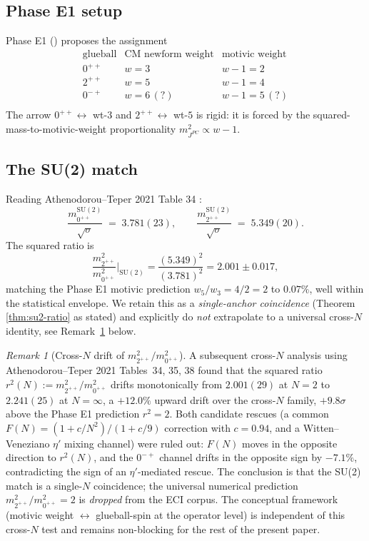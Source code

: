 \documentclass[11pt]{amsart}
\theoremstyle{definition}
\theoremstyle{remark}
\newtheorem{remark}[theorem]{Remark}
\begin{document}
\subsection{Phase E1 setup}\label{ss:phase-e1}

Phase E1 (\cite{PhaseE1}) proposes the assignment
\begin{equation}\label{eq:phase-e1-table}
\begin{array}{l|l|l}
\text{glueball} & \text{CM newform weight} & \text{motivic weight} \\ \hline
0^{++} & w = 3 & w - 1 = 2 \\
2^{++} & w = 5 & w - 1 = 4 \\
0^{-+} & w = 6\, (?) & w - 1 = 5\, (?) \\
\end{array}
\end{equation}
The arrow $0^{++} \leftrightarrow $ wt-$3$ and $2^{++} \leftrightarrow $ wt-$5$
is rigid: it is forced by the squared-mass-to-motivic-weight
proportionality $m_{J^{PC}}^2 \propto w - 1$.

\subsection{The SU(2) match}\label{ss:su2-match}

Reading Athenodorou--Teper 2021 Table 34 \cite{Athenodorou2021}:
\[
\frac{m_{0^{++}}^{\mathrm{SU(2)}}}{\sqrt{\sigma}} \;=\; 3.781(23),
\qquad
\frac{m_{2^{++}}^{\mathrm{SU(2)}}}{\sqrt{\sigma}} \;=\; 5.349(20).
\]
The squared ratio is
\[
\frac{m_{2^{++}}^2}{m_{0^{++}}^2}\bigg|_{\mathrm{SU(2)}}
= \frac{(5.349)^2}{(3.781)^2} = 2.001 \pm 0.017,
\]
matching the Phase E1 motivic prediction $w_{5}/w_{3} = 4/2 = 2$
to $0.07\%$, well within the statistical envelope. We retain this as
a \emph{single-anchor coincidence} (Theorem
\ref{thm:su2-ratio} as stated) and explicitly do \emph{not} extrapolate
to a universal cross-$N$ identity, see Remark~\ref{rk:phase-e1-cross-N-drift}
below.

\begin{remark}[Cross-$N$ drift of $m_{2^{++}}^2/m_{0^{++}}^2$]
\label{rk:phase-e1-cross-N-drift}
A subsequent cross-$N$ analysis using Athenodorou--Teper 2021
Tables~34, 35, 38 found that the squared ratio
$r^2(N) := m_{2^{++}}^2/m_{0^{++}}^2$ drifts monotonically from
$2.001(29)$ at $N = 2$ to $2.241(25)$ at $N = \infty$, a $+12.0\%$
upward drift over the cross-$N$ family, $+9.8\sigma$ above the Phase E1
prediction $r^2 = 2$. Both candidate rescues (a common $F(N) =
(1 + c/N^2)/(1 + c/9)$ correction with $c = 0.94$, and a
Witten--Veneziano $\eta'$ mixing channel) were ruled out: $F(N)$
moves in the opposite direction to $r^2(N)$, and the $0^{-+}$
channel drifts in the opposite sign by $-7.1\%$, contradicting the
sign of an $\eta'$-mediated rescue. The conclusion is that the
SU(2) match is a single-$N$ coincidence; the universal numerical
prediction $m_{2^{++}}^2/m_{0^{++}}^2 = 2$ is \emph{dropped} from the
ECI corpus. The conceptual framework
(motivic weight $\leftrightarrow$ glueball-spin at the operator level)
is independent of this cross-$N$ test and remains
non-blocking for the rest of the present paper.
\end{remark}
\end{document}
